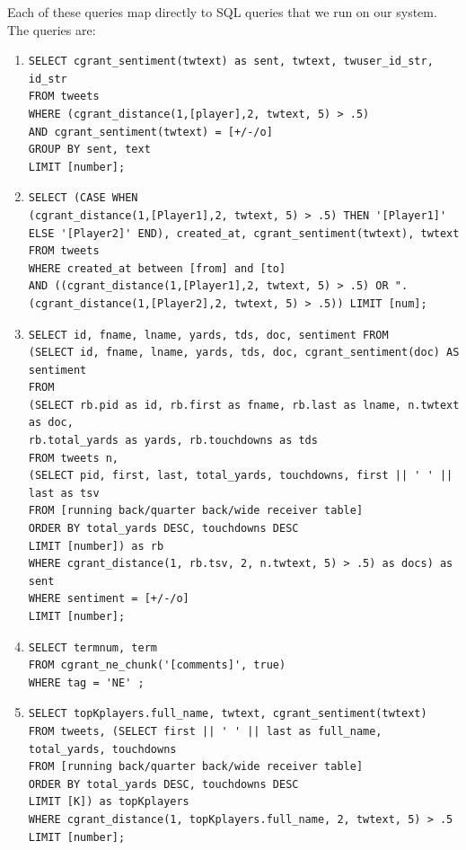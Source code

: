 \documentclass[11pt,onecolumn]{article}
\begin{document}
	Each of these queries map directly to SQL queries that we run on our system.
The queries are:
	\begin{enumerate}
	\item 
{\small
\begin{verbatim}
SELECT cgrant_sentiment(twtext) as sent, twtext, twuser_id_str, id_str
FROM tweets
WHERE (cgrant_distance(1,[player],2, twtext, 5) > .5)
AND cgrant_sentiment(twtext) = [+/-/o]
GROUP BY sent, text
LIMIT [number];	
\end{verbatim}
}
	\item
{\small
\begin{verbatim}
SELECT (CASE WHEN 
(cgrant_distance(1,[Player1],2, twtext, 5) > .5) THEN '[Player1]'
ELSE '[Player2]' END), created_at, cgrant_sentiment(twtext), twtext
FROM tweets
WHERE created_at between [from] and [to]
AND ((cgrant_distance(1,[Player1],2, twtext, 5) > .5) OR ".
(cgrant_distance(1,[Player2],2, twtext, 5) > .5)) LIMIT [num];
\end{verbatim}
}

	\item
{\small
\begin{verbatim}
SELECT id, fname, lname, yards, tds, doc, sentiment FROM
(SELECT id, fname, lname, yards, tds, doc, cgrant_sentiment(doc) AS sentiment
FROM
(SELECT rb.pid as id, rb.first as fname, rb.last as lname, n.twtext as doc, 
rb.total_yards as yards, rb.touchdowns as tds 
FROM tweets n, 
(SELECT pid, first, last, total_yards, touchdowns, first || ' ' || last as tsv
FROM [running back/quarter back/wide receiver table] 
ORDER BY total_yards DESC, touchdowns DESC
LIMIT [number]) as rb 
WHERE cgrant_distance(1, rb.tsv, 2, n.twtext, 5) > .5) as docs) as sent 
WHERE sentiment = [+/-/o]
LIMIT [number];

\end{verbatim}
}
	\item
{\small
\begin{verbatim}
SELECT termnum, term
FROM cgrant_ne_chunk('[comments]', true)
WHERE tag = 'NE' ;
\end{verbatim}
}
	\item
{\small
\begin{verbatim}
SELECT topKplayers.full_name, twtext, cgrant_sentiment(twtext) 
FROM tweets, (SELECT first || ' ' || last as full_name, total_yards, touchdowns
FROM [running back/quarter back/wide receiver table] 
ORDER BY total_yards DESC, touchdowns DESC 
LIMIT [K]) as topKplayers 
WHERE cgrant_distance(1, topKplayers.full_name, 2, twtext, 5) > .5 
LIMIT [number];
\end{verbatim}
}
	\end{enumerate}
\end{document}
